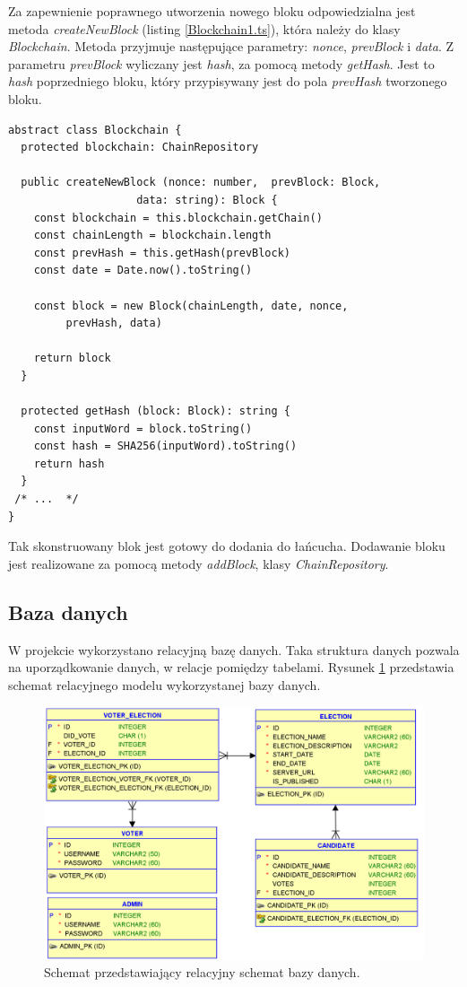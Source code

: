 \documentclass[a4paper,12pt]{book}
\begin{document}
Za zapewnienie poprawnego utworzenia nowego bloku odpowiedzialna jest metoda \textit{createNewBlock} (listing \ref{Blockchain1.ts}), która należy do klasy \textit{Blockchain}. Metoda przyjmuje następujące parametry: \textit{nonce}, \textit{prevBlock} i \textit{data}. Z parametru \textit{prevBlock} wyliczany jest \textit{hash}, za pomocą metody \textit{getHash}. Jest to \textit{hash} poprzedniego bloku, który przypisywany jest do pola \textit{prevHash} tworzonego bloku.

\newpage

\begin{lstlisting}[style=ES6, caption={Fragment klasy Blockchain.},label={Blockchain1.ts}]
abstract class Blockchain {
  protected blockchain: ChainRepository

  public createNewBlock (nonce: number,  prevBlock: Block, 
					data: string): Block {
    const blockchain = this.blockchain.getChain()
    const chainLength = blockchain.length
    const prevHash = this.getHash(prevBlock)
    const date = Date.now().toString()

    const block = new Block(chainLength, date, nonce,
		 prevHash, data)

    return block
  }

  protected getHash (block: Block): string {
    const inputWord = block.toString()
    const hash = SHA256(inputWord).toString()
    return hash
  }
 /* ...  */
}
\end{lstlisting}

Tak skonstruowany blok jest gotowy do dodania do łańcucha. Dodawanie bloku jest realizowane za pomocą metody \textit{addBlock}, klasy \textit{ChainRepository}.

\subsection{Baza danych}

W projekcie wykorzystano relacyjną bazę danych. Taka struktura danych pozwala na uporządkowanie danych, w relacje pomiędzy tabelami. Rysunek \ref{database} przedstawia schemat relacyjnego modelu wykorzystanej bazy danych.

\begin{figure}[h]
    	\centering
	\includegraphics[width=\textwidth]{images/Relational.png}
	\caption{Schemat przedstawiający relacyjny schemat bazy danych.}\label{database}
\end {figure}
\end{document}
